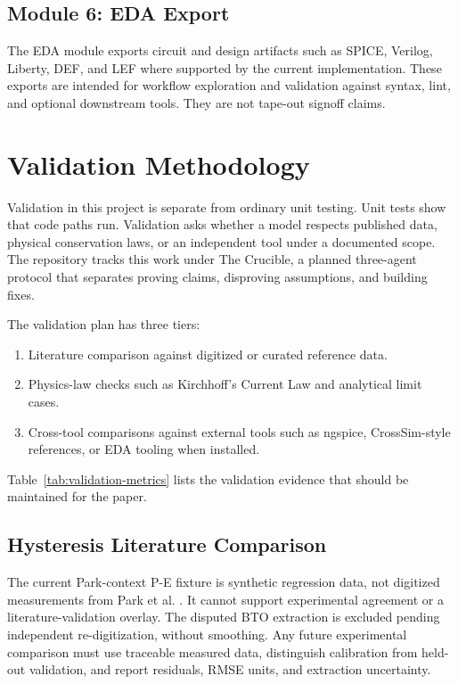 \documentclass[11pt]{article}
\begin{document}
\subsection{Module 6: EDA Export}

The EDA module exports circuit and design artifacts such as SPICE, Verilog, Liberty, DEF, and LEF where supported by the current implementation. These exports are intended for workflow exploration and validation against syntax, lint, and optional downstream tools. They are not tape-out signoff claims.

\section{Validation Methodology}

Validation in this project is separate from ordinary unit testing. Unit tests show that code paths run. Validation asks whether a model respects published data, physical conservation laws, or an independent tool under a documented scope. The repository tracks this work under The Crucible, a planned three-agent protocol that separates proving claims, disproving assumptions, and building fixes.

The validation plan has three tiers:

\begin{enumerate}
  \item Literature comparison against digitized or curated reference data.
  \item Physics-law checks such as Kirchhoff's Current Law and analytical limit cases.
  \item Cross-tool comparisons against external tools such as ngspice, CrossSim-style references, or EDA tooling when installed.
\end{enumerate}

Table~\ref{tab:validation-metrics} lists the validation evidence that should be maintained for the paper.



\subsection{Hysteresis Literature Comparison}

The current Park-context P-E fixture is synthetic regression data, not digitized measurements from Park et al. \citep{park2015}. It cannot support experimental agreement or a literature-validation overlay. The disputed BTO extraction is excluded pending independent re-digitization, without smoothing. Any future experimental comparison must use traceable measured data, distinguish calibration from held-out validation, and report residuals, RMSE units, and extraction uncertainty.
\end{document}

